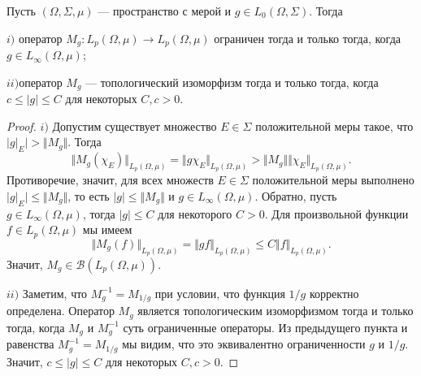 \begin{proposition}\label{MultpOpPropIfPeqqualsQ} Пусть $(\Omega,\Sigma,\mu)$ --- пространство с мерой и $g\in L_0(\Omega,\Sigma)$. Тогда 

$i)$ оператор $M_g:L_p(\Omega,\mu)\to L_p(\Omega,\mu)$ ограничен тогда и только тогда, когда $g\in L_\infty(\Omega,\mu)$;

$ii)$оператор $M_g$ --- топологический изоморфизм тогда и только тогда, когда $c\leq |g|\leq C$ для некоторых $C,c>0$.
\end{proposition}
\begin{proof}
$i)$ Допустим существует множество $E\in\Sigma$ положительной меры такое, что $|g|_E|>\Vert M_g\Vert$. Тогда
$$
\Vert M_g(\chi_E)\Vert_{L_p(\Omega,\mu)}
=\Vert g\chi_E\Vert_{L_p(\Omega,\mu)}
>\Vert M_g\Vert\Vert\chi_E\Vert_{L_p(\Omega,\mu)}.
$$
Противоречие, значит, для всех множеств $E\in\Sigma$ положительной меры выполнено $|g|_E|\leq \Vert M_g\Vert$, то есть $|g|\leq \Vert M_g\Vert$ и $g\in L_\infty(\Omega,\mu)$. Обратно, пусть $g\in L_\infty(\Omega,\mu)$, тогда $|g|\leq C$ для некоторого $C>0$. Для произвольной функции $f\in L_p(\Omega,\mu)$ мы имеем
$$
\Vert M_g(f)\Vert_{L_p(\Omega,\mu)}
=\Vert g  f\Vert_{L_p(\Omega,\mu)}
\leq C\Vert f\Vert_{L_p(\Omega,\mu)}.
$$
Значит, $M_g\in\mathcal{B}(L_p(\Omega,\mu))$.

$ii)$ Заметим, что $M_g^{-1}=M_{1/g}$ при условии, что функция $1/g$ корректно определена. Оператор $M_g$ является топологическим изоморфизмом тогда и только тогда, когда $M_g$ и $M_g^{-1}$ суть ограниченные операторы. Из предыдущего пункта и равенства $M_g^{-1}=M_{1/g}$ мы видим, что это эквивалентно ограниченности $g$ и $1/g$. Значит, $c\leq|g|\leq C$ для некоторых $C,c>0$.
\end{proof}

